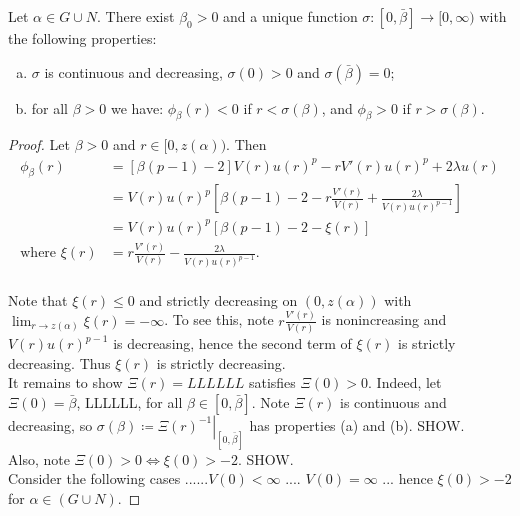 \newpage
\begin{lemma}Let $\alpha\in G\cup N$. There exist $\beta_0>0$ and a unique function $\sigma:[0,\bar\beta]\to[0,\infty)$ with the following properties: \begin{enumerate}[(a)]
	\item  $\sigma$ is continuous and decreasing, $\sigma(0)>0$ and $\sigma(\bar\beta)=0$;
    \item for all $\beta>0$ we have: $\phi_\beta(r)<0$ if $r<\sigma(\beta)$, and $\phi_\beta>0$ if $r>\sigma(\beta)$.
\end{enumerate}
\begin{proof} 
Let $\beta>0$ and $r\in[0,z(\alpha))$. Then \begin{align*}
\phi_{\beta}(r)&=\left[\beta(p-1)-2\right]V(r)u(r)^p-rV'(r)u(r)^p+2\lambda u(r) %
\\ &=V(r)u(r)^p\left[\beta(p-1)-2-r\frac{V'(r)}{V(r)}+\frac{2\lambda}{V(r)u(r)^{p-1}}\right] 
\\ &= V(r)u(r)^p\left[\beta(p-1)-2-\xi(r)\right]
\\\text{where }\xi(r)&=r\frac{V'(r)}{V(r)}-\frac{2\lambda}{V(r)u(r)^{p-1}}.
\end{align*}\\

Note that $\xi(r)\leq0$ and strictly decreasing on $(0,z(\alpha))$ with $\lim_{r\to z(\alpha)}\xi(r)=-\infty$. To see this, note $r\frac{V'(r)}{V(r)}$ is nonincreasing and $V(r)u(r)^{p-1}$ is decreasing, hence the second term of $\xi(r)$ is strictly decreasing. Thus $\xi(r)$ is strictly decreasing.\\

It remains to show $\Xi(r)=LLLLLL$ satisfies $\Xi(0)>0$. Indeed, let $\Xi(0)=\bar\beta$, LLLLLL, for all $\beta\in[0,\bar\beta]$. Note $\Xi(r)$ is continuous and decreasing, so $\sigma(\beta)\coloneqq\left.\Xi(r)^{-1}\right|_{[0,\bar\beta]}$ has properties (a) and (b). SHOW. \\

Also, note $\Xi(0)>0\iff\xi(0)>-2$. SHOW.\\

Consider the following cases ......$V(0)<\infty$ .... $V(0)=\infty$ ... hence $\xi(0)>-2$ for $\alpha\in(G\cup N)$.

\end{proof}
\end{lemma}